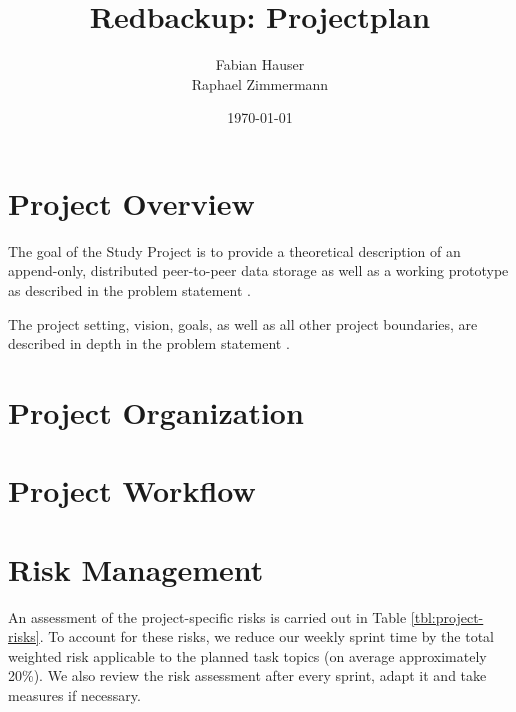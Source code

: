 \documentclass[a4paper]{article}
\title{Redbackup: Projectplan}
\author{
		Fabian Hauser \\
		Raphael Zimmermann
}
\date{\today}
\begin{document}
\maketitle

\section{Project Overview}
The goal of the Study Project is to provide a theoretical description of an append-only, distributed peer-to-peer data storage as well as a working prototype as described in the problem statement \cite{problemstatement}.

The project setting, vision, goals, as well as all other project boundaries, are described in depth in the problem statement \cite{problemstatement}.

\section{Project Organization}


\section{Project Workflow}


\section{Risk Management}

An assessment of the project-specific risks is carried out in Table \ref{tbl:project-risks}. To account for these risks, we reduce our weekly sprint time by the total weighted risk applicable to the planned task topics (on average approximately 20\%). We also review the risk assessment after every sprint, adapt it and take measures if necessary.
\end{document}
